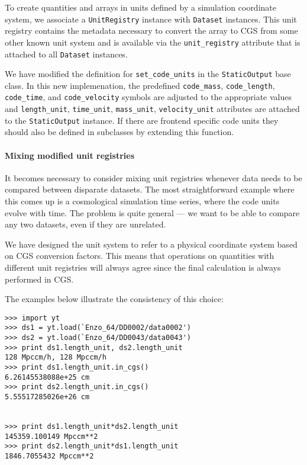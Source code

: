 To create quantities and arrays in units defined by a simulation
coordinate system, we associate a \texttt{UnitRegistry} instance with
\texttt{Dataset} instances. This unit registry contains the
metadata necessary to convert the array to CGS from some other known
unit system and is available via the \texttt{unit\_registry} attribute
that is attached to all \texttt{Dataset} instances.

We have modified the definition for \texttt{set\_code\_units} in the
\texttt{StaticOutput} base class. In this new implemenation, the
predefined \texttt{code\_mass}, \texttt{code\_length},
\texttt{code\_time}, and \texttt{code\_velocity} symbols are adjusted to
the appropriate values and \texttt{length\_unit}, \texttt{time\_unit},
\texttt{mass\_unit}, \texttt{velocity\_unit} attributes are attached to
the \texttt{StaticOutput} instance. If there are frontend specific code
units they should also be defined in subclasses by extending this function.

\paragraph{Mixing modified unit
registries}\label{mixing-modified-unit-registries}

It becomes necessary to consider mixing unit registries whenever data
needs to be compared between disparate datasets. The most
straightforward example where this comes up is a cosmological simulation
time series, where the code units evolve with time. The problem is quite
general --- we want to be able to compare any two datasets, even if they
are unrelated.

We have designed the unit system to refer to a physical coordinate
system based on CGS conversion factors. This means that operations on
quantities with different unit registries will always agree since the
final calculation is always performed in CGS.

The examples below illustrate the consistency of this choice:

\begin{Verbatim}
>>> import yt
>>> ds1 = yt.load(`Enzo_64/DD0002/data0002')
>>> ds2 = yt.load(`Enzo_64/DD0043/data0043')
>>> print ds1.length_unit, ds2.length_unit 
128 Mpccm/h, 128 Mpccm/h
>>> print ds1.length_unit.in_cgs()
6.26145538088e+25 cm
>>> print ds2.length_unit.in_cgs() 
5.55517285026e+26 cm 


>>> print ds1.length_unit*ds2.length_unit 
145359.100149 Mpccm**2
>>> print ds2.length_unit*ds1.length_unit 
1846.7055432 Mpccm**2
\end{Verbatim}

